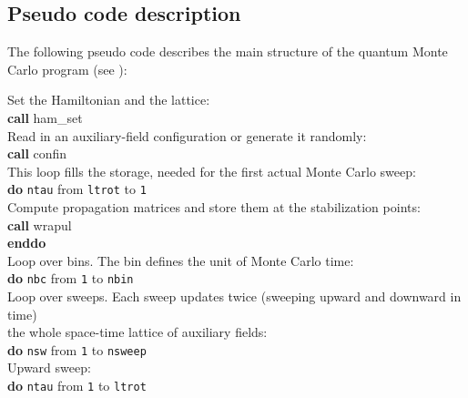 %
\subsection{Pseudo code description}\label{sec:pseudocode}
%
The following pseudo code describes the main structure of the quantum Monte Carlo program (see ):

\begin{mdframed}[frametitle={Implementation of the auxiliary-field QMC method:}]
{\setlength{\parindent}{0pt}
Set the Hamiltonian and the lattice:\\
\textbf{call} ham\_set\\
Read in an auxiliary-field configuration or generate it randomly:\\
\textbf{call} confin\\

This loop fills the storage, needed for the first actual Monte Carlo sweep:\\
\textbf{do} \texttt{ntau} from  \texttt{ltrot} to \texttt{1}\\
\hspace*{2em} Compute propagation matrices and store them at the stabilization points:\\
\hspace*{2em} \textbf{call} wrapul\\
\textbf{enddo}\\
 
Loop over bins. The bin defines the unit of Monte Carlo time:\\
\textbf{do} \texttt{nbc} from  \texttt{1} to \texttt{nbin} \\

   Loop over sweeps. Each sweep updates twice (sweeping upward and downward in time)\\
   the whole space-time lattice of auxiliary fields:\\
   \textbf{do} \texttt{nsw} from  \texttt{1} to \texttt{nsweep}  \\
   
      Upward sweep:\\
      \textbf{do} \texttt{ntau} from \texttt{1} to \texttt{ltrot}\\
      
}
\end{mdframed}
